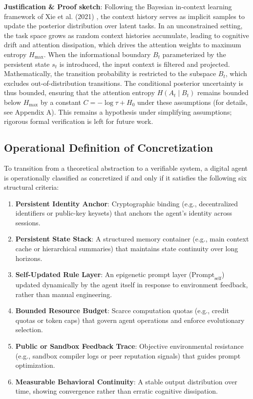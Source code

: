 \documentclass[10pt,journal,compsoc]{IEEEtran}
\begin{document}
\textbf{Justification \& Proof sketch}: Following the Bayesian in-context learning framework of Xie et al. (2021) \cite[Section~3]{xie2021}, the context history serves as implicit samples to update the posterior distribution over latent tasks. In an unconstrained setting, the task space grows as random context histories accumulate, leading to cognitive drift and attention dissipation, which drives the attention weights to maximum entropy $H_{\max}$. When the informational boundary $B_t$ parameterized by the persistent state $s_t$ is introduced, the input context is filtered and projected. Mathematically, the transition probability is restricted to the subspace $B_t$, which excludes out-of-distribution transitions. The conditional posterior uncertainty is thus bounded, ensuring that the attention entropy $H(A_t \mid B_t)$ remains bounded below $H_{\max}$ by a constant $C = -\log \tau + H_0$ under these assumptions (for details, see Appendix A). This remains a hypothesis under simplifying assumptions; rigorous formal verification is left for future work.

\subsection{Operational Definition of Concretization}
To transition from a theoretical abstraction to a verifiable system, a digital agent is operationally classified as concretized if and only if it satisfies the following six structural criteria:
\begin{enumerate}
    \item \textbf{Persistent Identity Anchor}: Cryptographic binding (e.g., decentralized identifiers or public-key keysets) that anchors the agent's identity across sessions.
    \item \textbf{Persistent State Stack}: A structured memory container (e.g., main context cache or hierarchical summaries) that maintains state continuity over long horizons.
    \item \textbf{Self-Updated Rule Layer}: An epigenetic prompt layer ($\text{Prompt}_{\text{self}}$) updated dynamically by the agent itself in response to environment feedback, rather than manual engineering.
    \item \textbf{Bounded Resource Budget}: Scarce computation quotas (e.g., credit quotas or token caps) that govern agent operations and enforce evolutionary selection.
    \item \textbf{Public or Sandbox Feedback Trace}: Objective environmental resistance (e.g., sandbox compiler logs or peer reputation signals) that guides prompt optimization.
    \item \textbf{Measurable Behavioral Continuity}: A stable output distribution over time, showing convergence rather than erratic cognitive dissipation.
\end{enumerate}
\end{document}
